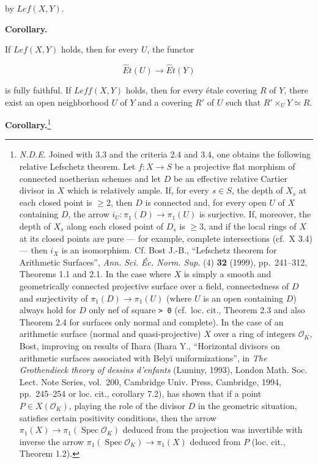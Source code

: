 \documentclass[
  11pt,
  a4paper,
]{book}
\begin{document}
by \(Lef(X, Y)\).

\textbf{Corollary.}

If \(Lef(X, Y)\) holds, then for every \(U\), the functor

\[ \hat{E}t(U) \longrightarrow \hat{E}t(Y) \]

is fully faithful. If \(Leff(X, Y)\) holds, then for every étale
covering \(R\) of \(Y\), there exist an open neighborhood \(U\) of \(Y\)
and a covering \(R'\) of \(U\) such that \(R' \times_{U} Y \simeq R\).

\textbf{Corollary.}\footnote{\emph{N.D.E.} Joined with 3.3 and the
  criteria 2.4 and 3.4, one obtains the following relative Lefschetz
  theorem. Let \(f: X \to S\) be a projective flat morphism of connected
  noetherian schemes and let \(D\) be an effective relative Cartier
  divisor in \(X\) which is relatively ample. If, for every \(s \in S\),
  the depth of \(X_{s}\) at each closed point is \(\geqslant 2\), then
  \(D\) is connected and, for every open \(U\) of \(X\) containing
  \(D\), the arrow \(i_{U}: \pi_{1}(D) \to \pi_{1}(U)\) is surjective.
  If, moreover, the depth of \(X_{s}\) along each closed point of
  \(D_{s}\) is \(\geqslant 3\), and if the local rings of \(X\) at its
  closed points are pure --- for example, complete intersections (cf.~X
  3.4) --- then \(i_{X}\) is an isomorphism. Cf. Bost J.-B., ``Lefschetz
  theorem for Arithmetic Surfaces'', \emph{Ann. Sci. Éc. Norm. Sup.} (4)
  \textbf{32} (1999), pp.~241--312, Theorems 1.1 and 2.1. In the case
  where \(X\) is simply a smooth and geometrically connected projective
  surface over a field, connectedness of \(D\) and surjectivity of
  \(\pi_{1}(D) \to \pi_{1}(U)\) (where \(U\) is an open containing
  \(D\)) always hold for \(D\) only nef of square
  \texttt{\textgreater{}\ 0} (cf.~loc. cit., Theorem 2.3 and also
  Theorem 2.4 for surfaces only normal and complete). In the case of an
  arithmetic surface (normal and quasi-projective) \(X\) over a ring of
  integers \(\mathcal{O}_{K}\), Bost, improving on results of Ihara
  (Ihara Y., ``Horizontal divisors on arithmetic surfaces associated
  with Belyĭ uniformizations'', in \emph{The Grothendieck theory of
  dessins d'enfants} (Luminy, 1993), London Math. Soc. Lect. Note
  Series, vol.~200, Cambridge Univ. Press, Cambridge, 1994, pp.~245--254
  or loc. cit., corollary 7.2), has shown that if a point \(P \in
  X(\mathcal{O}_{K})\), playing the role of the divisor \(D\) in the
  geometric situation, satisfies certain positivity conditions, then the
  arrow \(\pi_{1}(X) \to \pi_{1}(\operatorname{Spec} \mathcal{O}_{K})\)
  deduced from the projection was invertible with inverse the arrow
  \(\pi_{1}(\operatorname{Spec} \mathcal{O}_{K}) \to \pi_{1}(X)\)
  deduced from \(P\) (loc. cit., Theorem 1.2).}
\end{document}
